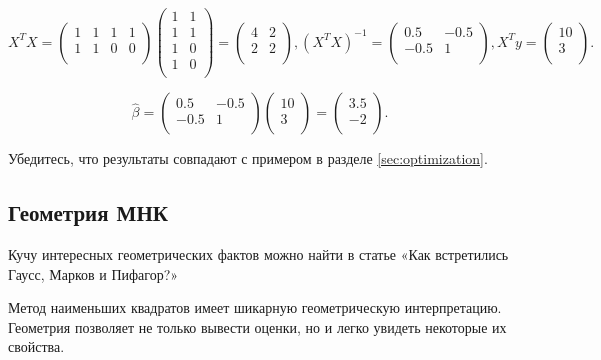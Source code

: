 \documentclass[12pt]{article}
\newcommand{\hb}{\hat{\beta}}
\begin{document}
\[ X^TX = \begin{pmatrix}
    1 & 1 & 1 & 1\\
    1 & 1 & 0 & 0\\
\end{pmatrix}
\begin{pmatrix}
    1 & 1 \\
    1 & 1 \\
    1 & 0 \\
    1 & 0 \\
\end{pmatrix} =
\begin{pmatrix}
    4 & 2 \\
    2 & 2 \\
\end{pmatrix},
(X^TX)^{-1} = 
\begin{pmatrix}
    0.5 & -0.5 \\
    -0.5 & 1 \\
\end{pmatrix},
X^Ty = 
\begin{pmatrix}
    10 \\
    3\\
\end{pmatrix}.
\]

\[
\hb = \begin{pmatrix}
    0.5 & -0.5 \\
    -0.5 & 1 \\
\end{pmatrix}
\begin{pmatrix}
    10 \\
    3\\
\end{pmatrix} = 
\begin{pmatrix}
    3.5 \\
    -2\\
\end{pmatrix}.
\]

Убедитесь, что результаты совпадают с примером в разделе \ref{sec:optimization}.

\subsection{Геометрия МНК}

Кучу интересных геометрических фактов можно найти в статье \cite{gnilova2018gauss} «Как встретились Гаусс, Марков и Пифагор?»

Метод наименьших квадратов имеет шикарную геометрическую интерпретацию.
Геометрия позволяет не только вывести оценки, но и легко увидеть некоторые их свойства. 
\end{document}
